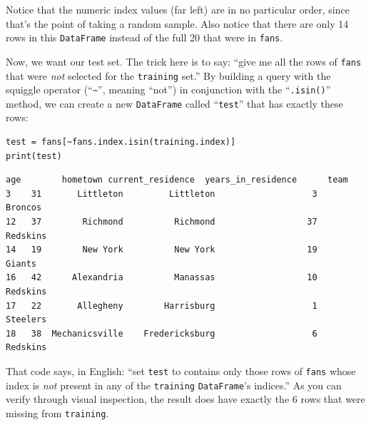 Notice that the numeric index values (far left) are in no particular order,
since that's the point of taking a random sample. Also notice that there are
only 14 rows in this \texttt{DataFrame} instead of the full 20 that were in
\texttt{fans}.


Now, we want our test set. The trick here is to say: ``give me all the rows of
\texttt{fans} that were \textit{not} selected for the \texttt{training} set.''
By building a query with the squiggle operator (``\texttt{\textasciitilde}'',
meaning ``not'') in conjunction with the ``\texttt{.isin()}'' method, we can
create a new \texttt{DataFrame} called ``\texttt{test}'' that has exactly these
rows:

\begin{Verbatim}[fontsize=\small,samepage=true,frame=single,framesep=3mm]
test = fans[~fans.index.isin(training.index)]
print(test)
\end{Verbatim}
\vspace{-.2in}

\begin{Verbatim}[fontsize=\small,samepage=true,frame=leftline,framesep=5mm,framerule=1mm]
    age        hometown current_residence  years_in_residence      team
3    31       Littleton         Littleton                   3   Broncos
12   37        Richmond          Richmond                  37  Redskins
14   19        New York          New York                  19    Giants
16   42      Alexandria          Manassas                  10  Redskins
17   22       Allegheny        Harrisburg                   1  Steelers
18   38  Mechanicsville    Fredericksburg                   6  Redskins
\end{Verbatim}

That code says, in English: ``set \texttt{test} to contains only those rows of
\texttt{fans} whose index is \textit{not} present in any of the
\texttt{training} \texttt{DataFrame}'s indices.'' As you can verify through
visual inspection, the result does have exactly the 6 rows that were missing
from \texttt{training}.



%
%
%
%
%
